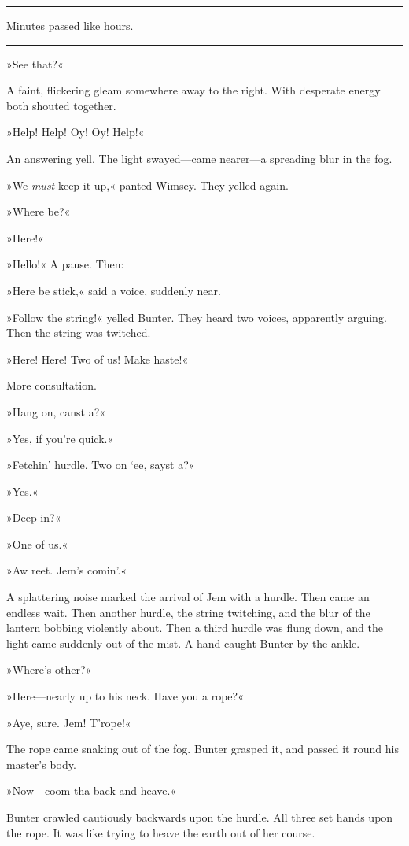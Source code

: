 \noindent\hfil\rule{0.5\textwidth}{.4pt}\hfil 

Minutes passed like hours. 

\noindent\hfil\rule{0.5\textwidth}{.4pt}\hfil 

»See that?«

A faint, flickering gleam somewhere away to the right. With desperate energy both shouted together.

»Help! Help! Oy! Oy! Help!«

An answering yell. The light swayed—came nearer—a spreading blur in the fog.

»We \textit{must} keep it up,« panted Wimsey. They yelled again.

»Where be?«

»Here!«

»Hello!« A pause. Then:

»Here be stick,« said a voice, suddenly near.

»Follow the string!« yelled Bunter. They heard two voices, apparently arguing. Then the string was twitched.

»Here! Here! Two of us! Make haste!«

More consultation.

»Hang on, canst a?«

»Yes, if you're quick.«

»Fetchin' hurdle. Two on `ee, sayst a?«

»Yes.«

»Deep in?«

»One of us.«

»Aw reet. Jem's comin'.«

A splattering noise marked the arrival of Jem with a hurdle. Then came an endless wait. Then another hurdle, the string twitching, and the blur of the lantern bobbing violently about. Then a third hurdle was flung down, and the light came suddenly out of the mist. A hand caught Bunter by the ankle.

»Where's other?«

»Here—nearly up to his neck. Have you a rope?«

»Aye, sure. Jem! T'rope!«

The rope came snaking out of the fog. Bunter grasped it, and passed it round his master's body.

»Now—coom tha back and heave.«

Bunter crawled cautiously backwards upon the hurdle. All three set hands upon the rope. It was like trying to heave the earth out of her course.

